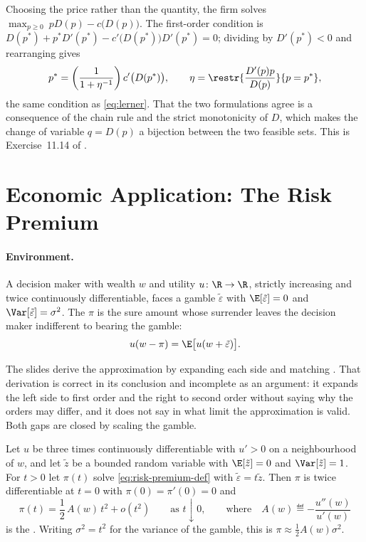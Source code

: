 \begin{eg}\label{eg:markup-price-choice}
	Choosing the price rather than the quantity, the firm solves
	$\max_{p\geq0}\ pD(p)-c\bigl(D(p)\bigr)$. The first-order condition is
	$D(p^\ast)+p^\ast D'(p^\ast)-c'\bigl(D(p^\ast)\bigr)D'(p^\ast)=0$; dividing by
	$D'(p^\ast)<0$ and rearranging gives
	\[
		p^\ast=\left(\frac{1}{1+\eta^{-1}}\right)c'\bigl(D(p^\ast)\bigr),
		\qquad
		\eta=\restr{\frac{D'(p)p}{D(p)}}{p=p^\ast},
	\]
	the same condition as \eqref{eq:lerner}. That the two formulations agree is a
	consequence of the chain rule and the strict monotonicity of $D$, which makes
	the change of variable $q=D(p)$ a bijection between the two feasible sets. This
	is Exercise~11.14 of \textcite{fukuda2026notes}
	\autocite[slide 25]{fukuda2026calculus}.
\end{eg}

\section{Economic Application: The Risk Premium}\label{sec:c1-risk}

\paragraph{Environment.} A decision maker with wealth $w$ and utility
$u\colon\R\to\R$, strictly increasing and twice continuously differentiable,
faces a gamble $\tilde\varepsilon$ with $\E[\tilde\varepsilon]=0$ and
$\Var[\tilde\varepsilon]=\sigma^2$. The 
$\pi$ is the sure amount whose surrender leaves the decision maker indifferent to
bearing the gamble:
\begin{equation}\label{eq:risk-premium-def}
	u(w-\pi)=\E\bigl[u(w+\tilde\varepsilon)\bigr].
\end{equation}

The slides derive the approximation by expanding each side and matching
\autocite[slides 26--27, 41]{fukuda2026calculus}. That derivation is correct in
its conclusion and incomplete as an argument: it expands the left side to first
order and the right to second order without saying why the orders may differ, and
it does not say in what limit the approximation is valid. Both gaps are closed by
scaling the gamble.

\begin{theorem}\label{thm:arrow-pratt}
	Let $u$ be three times continuously differentiable with $u'>0$ on a
	neighbourhood of $w$, and let $\tilde z$ be a bounded random variable with
	$\E[\tilde z]=0$ and $\Var[\tilde z]=1$. For $t>0$ let $\pi(t)$ solve
	\eqref{eq:risk-premium-def} with $\tilde\varepsilon=t\tilde z$. Then $\pi$ is
	twice differentiable at $t=0$ with $\pi(0)=\pi'(0)=0$ and
	\[
		\pi(t)=\frac{1}{2}\,A(w)\,t^2+o(t^2)
		\qquad\text{as }t\downarrow0,
		\qquad\text{where}\quad
		A(w)\eqdef-\frac{u''(w)}{u'(w)}
	\]
	is the .
	Writing $\sigma^2=t^2$ for the variance of the gamble, this is
	$\pi\approx\tfrac12A(w)\sigma^2$.
\end{theorem}

